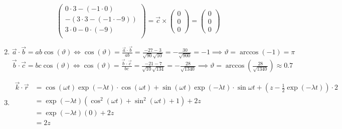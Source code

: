 \documentclass[sectionformat = Aufgabe]{gadsescript}
\begin{document}
\begin{enumerate}[label=\alph*)]
\begin{enumerate}[label=\roman*)]
\[						\begin{pmatrix}
							0 \cdot 3 - (-1 \cdot 0)\\
							-\left(3 \cdot 3 - (-1 \cdot -9)\right)\\
							3 \cdot 0 - 0 \cdot (-9)\\
						\end{pmatrix}
						= \vec c \times
						\begin{pmatrix}
							0\\
							0\\
							0
						\end{pmatrix}
						= \begin{pmatrix}0\\0\\0\end{pmatrix}
					\]%
		\end{enumerate}
	\item $\vec a \cdot\vec b = ab \cos(\vartheta) \iff \cos(\vartheta) = \frac{\vec a \cdot \vec b}{ab} = \frac{-27-3}{\sqrt{90}\sqrt{10}} = -\frac{30}{\sqrt{900}} = -1 \implies \vartheta = \arccos(-1) = \pi $\\
		$\vec b \cdot \vec c = bc \cos(\vartheta) \iff \cos(\vartheta) = \frac{\vec b \cdot \vec c}{bc} = \frac{-21-7}{\sqrt{10}\sqrt{134}} = -\frac{28}{\sqrt{1340}} \implies \vartheta = \arccos(\frac{28}{\sqrt{1340}}) \approx 0.7$
	\item \begin{align*}
			\vec k \cdot \vec r &= \cos(\omega t)\exp(-\lambda t) \cdot \cos(\omega t) + \sin(\omega t) \exp(-\lambda t) \cdot \sin{\omega t} + \left( z - \frac{1}{2}\exp(-\lambda t) \right) \cdot 2\\
			~&= \exp(-\lambda t) \left( \cos^2(\omega t) + \sin^2(\omega t) + 1\right) + 2z\\
			~&= \exp(-\lambda t) (0) + 2z\\
			~&= 2z
	\end{align*}
\end{enumerate}
\end{document}
